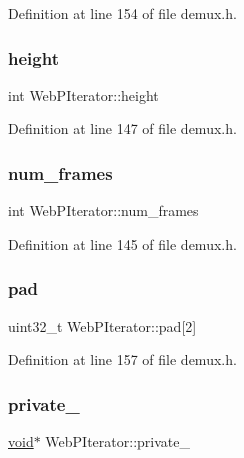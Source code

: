 Definition at line 154 of file demux.\+h.

\mbox{\label{struct_web_p_iterator_a020f28930a5d971bbbc09706c07bfb52}} 
\subsubsection{\texorpdfstring{height}{height}}
{\footnotesize\ttfamily int Web\+P\+Iterator\+::height}



Definition at line 147 of file demux.\+h.

\mbox{\label{struct_web_p_iterator_a2740a6c72c27ed33daa3674f361489ab}} 
\subsubsection{\texorpdfstring{num\_frames}{num\_frames}}
{\footnotesize\ttfamily int Web\+P\+Iterator\+::num\+\_\+frames}



Definition at line 145 of file demux.\+h.

\mbox{\label{struct_web_p_iterator_a6e288ad78e9c3f077193f215f90a4893}} 
\subsubsection{\texorpdfstring{pad}{pad}}
{\footnotesize\ttfamily uint32\+\_\+t Web\+P\+Iterator\+::pad\mbox{[}2\mbox{]}}



Definition at line 157 of file demux.\+h.

\mbox{\label{struct_web_p_iterator_a07a320cffb5b21dca370a60428944a7b}} 
\subsubsection{\texorpdfstring{private\_}{private\_}}
{\footnotesize\ttfamily \mbox{\hyperlink{_s_d_l__opengles2__gl2ext_8h_ae5d8fa23ad07c48bb609509eae494c95}{void}}$\ast$ Web\+P\+Iterator\+::private\+\_\+}



